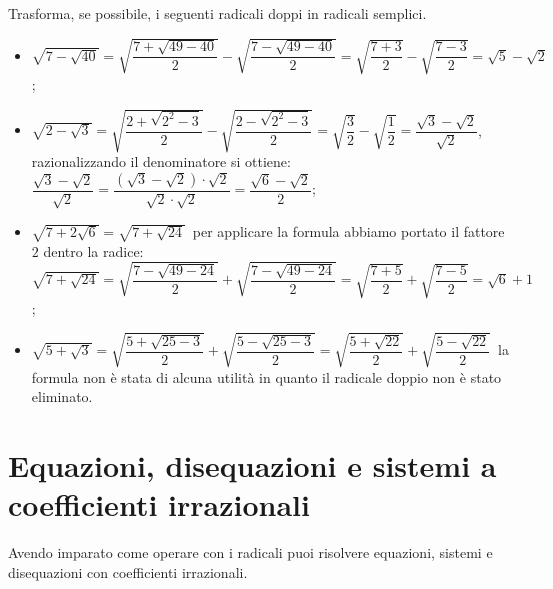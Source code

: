 \begin{exrig}
 \begin{esempio}
Trasforma, se possibile, i seguenti radicali doppi in radicali semplici.
\begin{itemize}
 \item $\sqrt{7-\sqrt{40}}=\sqrt{\dfrac{7+\sqrt{49-40}} 2}-\sqrt{\dfrac{7-\sqrt{49-40}} 2}=\sqrt{\dfrac{7+3} 2}-\sqrt{\dfrac{7-3} 2}=\sqrt 5-\sqrt 2$;
 \item $\sqrt{2-\sqrt 3}=\sqrt{\dfrac{2+\sqrt{2^2-3}} 2}-\sqrt{\dfrac{2-\sqrt{2^2-3}} 2}=\sqrt{\dfrac 3 2}-\sqrt{\dfrac 1 2}=\dfrac{\sqrt 3-\sqrt 2}{\sqrt 2}$, razionalizzando il denominatore si ottiene: $\dfrac{\sqrt 3-\sqrt 2}{\sqrt 2}=\dfrac{(\sqrt 3-\sqrt 2)\cdot \sqrt 2}{\sqrt 2\cdot \sqrt 2}=\dfrac{\sqrt 6-\sqrt 2} 2$;
 \item $\sqrt{7+2\sqrt 6}=\sqrt{7+\sqrt{24}}$\, per applicare la formula abbiamo portato il fattore $2$ dentro la radice: $\sqrt{7+\sqrt{24}}=\sqrt{\dfrac{7-\sqrt{49-24}} 2}+\sqrt{\dfrac{7-\sqrt{49-24}} 2}=\sqrt{\dfrac{7+5} 2}+\sqrt{\dfrac{7-5} 2}=\sqrt 6+1$;
 \item $\sqrt{5+\sqrt 3}=\sqrt{\dfrac{5+\sqrt{25-3}} 2}+\sqrt{\dfrac{5-\sqrt{25-3}} 2}=\sqrt{\dfrac{5+\sqrt{22}} 2}+\sqrt{\dfrac{5-\sqrt{22}} 2}$\, la formula non è stata di alcuna utilità in quanto il radicale doppio non è stato eliminato.
\end{itemize}
 \end{esempio}
\end{exrig}
\vspazio\ovalbox{\risolvii \ref{ese:2.77}, \ref{ese:2.78}, \ref{ese:2.79}}

\section{Equazioni, disequazioni e sistemi a coefficienti irrazionali}
Avendo imparato come operare con i radicali puoi risolvere equazioni, sistemi e disequazioni con coefficienti irrazionali.

